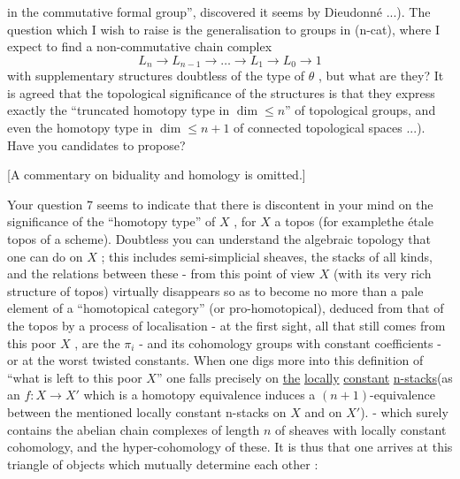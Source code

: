 \documentclass[11pt]{article}
\newcommand{\scanpage}[1]{\par\bigskip\noindent{\small\sffamily[scan #1]}\par}
\newcommand{\mspage}[1]{{\small\sffamily[p.\,#1]}}
\newcommand{\hand}[1]{\textcolor{blue}{#1}}
\newcommand{\uline}[1]{\underline{#1}}
\begin{document}
in the commutative formal group'', discovered it seems by Dieudonné
...). The question which I wish to raise is the generalisation to
groups in (n-cat), where I expect to find a non-commutative chain
complex
\[ L_n \to L_{n-1} \to \dots \to L_1 \to L_0 \to 1 \]
with supplementary structures doubtless of the type of $\theta$ , but
what are they? It is agreed that the topological significance of
the structures is that they express exactly the ``truncated homotopy
type in $\dim \leq n$'' of topological groups, and even the homotopy
type in $\dim \leq n+1$ of connected topological spaces ...). Have
you candidates to propose?

[A commentary on biduality and homology is omitted.]

\mspage{\hand{132}}

\clearpage
\scanpage{134-2/132}
\mspage{- 5 -}

Your question 7 seems to indicate that there is discontent in
your mind on the significance of the ``homotopy type'' of $X$ , for
$X$ a topos (for examplethe étale topos of a scheme). Doubtless
you can understand the algebraic topology that one can do on $X$ ;
this includes semi-simplicial sheaves, the stacks of all kinds, and
the relations between these - from this point of view $X$ (with
its very rich structure of topos) virtually disappears so as to
become no more than a pale element of a ``homotopical category''
(or pro-homotopical), deduced from that of the topos by a process
of localisation
- at the first sight, all that still comes from this poor $X$ , are
the $\pi_i$ - and its cohomology groups with constant coefficients -
or at the worst twisted constants. When one digs more into this
definition of ``what is left to this poor $X$'' one falls precisely
on \uline{the} \uline{locally} \uline{constant} \uline{n-stacks}(as an $f : X \to X'$ which is a
homotopy equivalence induces a $(n+1)$-equivalence between the
mentioned locally constant n-stacks on $X$ and on $X'$). - which surely
contains the abelian chain complexes of length $n$ of sheaves with
locally constant cohomology, and the hyper-cohomology of these.
It is thus that one arrives at this triangle of objects which
mutually determine each other :
\end{document}
